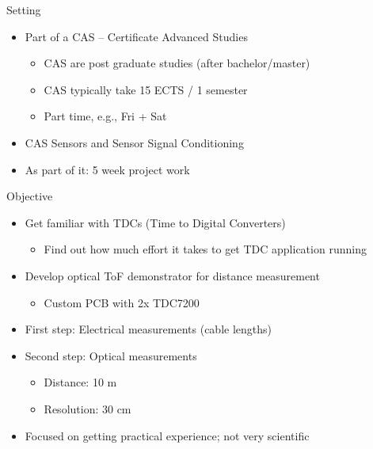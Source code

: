 \begin{frame}{Setting}
    \begin{itemize}
        \item Part of a CAS -- Certificate Advanced Studies
              \begin{itemize}
                  \item CAS are post graduate studies (after bachelor/master)
                  \item CAS typically take 15 ECTS / 1 semester
                  \item Part time, e.g., Fri + Sat
              \end{itemize}
        \item<2-> CAS Sensors and Sensor Signal Conditioning \cite{ost2025casssc}
        \item<2-> As part of it: 5 week project work
    \end{itemize}
\end{frame}

\begin{frame}{Objective}
    \begin{itemize}
        \item Get familiar with TDCs (Time to Digital Converters)
              \begin{itemize}
                  \item Find out how much effort it takes to get TDC application running
              \end{itemize}
        \item<2-> Develop optical ToF demonstrator for distance measurement
              \begin{itemize}
                  \item Custom PCB with 2x TDC7200
              \end{itemize}
        \item<3-> First step: Electrical measurements (cable lengths)
        \item<3-> Second step: Optical measurements
              \begin{itemize}
                  \item Distance: 10 m
                  \item Resolution: 30 cm
              \end{itemize}
        \item<4->[$\Rightarrow$] Focused on getting practical experience; not very scientific
    \end{itemize}
\end{frame}

